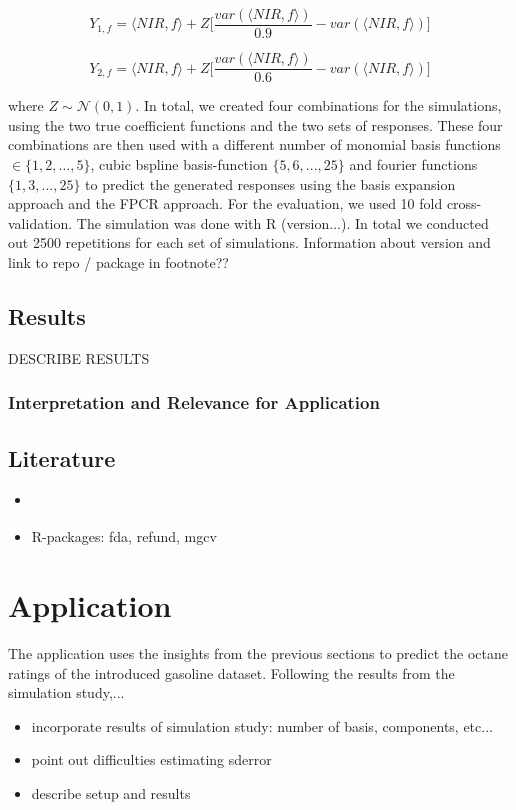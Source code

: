 \documentclass[11pt,twoside,a4paper]{article}
\begin{document}
		$$Y_{1,f} = \langle NIR, f\rangle + Z  \biggl\lbrack\frac{var(\langle NIR, f\rangle)}{0.9} - var(\langle NIR, f\rangle)\biggr\rbrack$$ 
		
		$$Y_{2,f} = \langle NIR, f\rangle + Z  \biggl\lbrack\frac{var(\langle NIR, f\rangle)}{0.6} - var(\langle NIR, f\rangle)\biggr\rbrack$$
		
		where $Z \sim \mathcal{N}(0,1)$. In total, we created four combinations for the simulations, using the two true coefficient functions and the two sets of responses. These four combinations are then used with a different number of monomial basis functions $ \in \{1,2, \dots, 5\}$, cubic bspline basis-function $\{5,6,...,25\}$ and fourier functions $\{1,3,...,25\}$ to predict the generated responses using the basis expansion approach and the FPCR approach. For the evaluation, we used 10 fold cross-validation. The simulation was done with R (version...). In total we conducted out 2500 repetitions for each set of simulations. {\color{green} Information about version and link to repo / package in footnote??}
		
	
	\subsection{Results}
	DESCRIBE RESULTS

	\subsubsection{Interpretation and Relevance for Application}

	\subsection{Literature}
	\begin{itemize}
		\item \cite{shonkwiler_explorations_2009}
		\item R-packages: fda, refund, mgcv
	\end{itemize}
	
	\newpage
	\section{Application}
The application uses the insights from the previous sections to predict the octane ratings of the introduced gasoline dataset. Following the results from the simulation study,... 
\begin{itemize}
\item
{\color{green} incorporate results of simulation study: number of basis, components, etc...}
\item
point out difficulties estimating sderror
\item
describe setup and results
\end{itemize}
\end{document}
